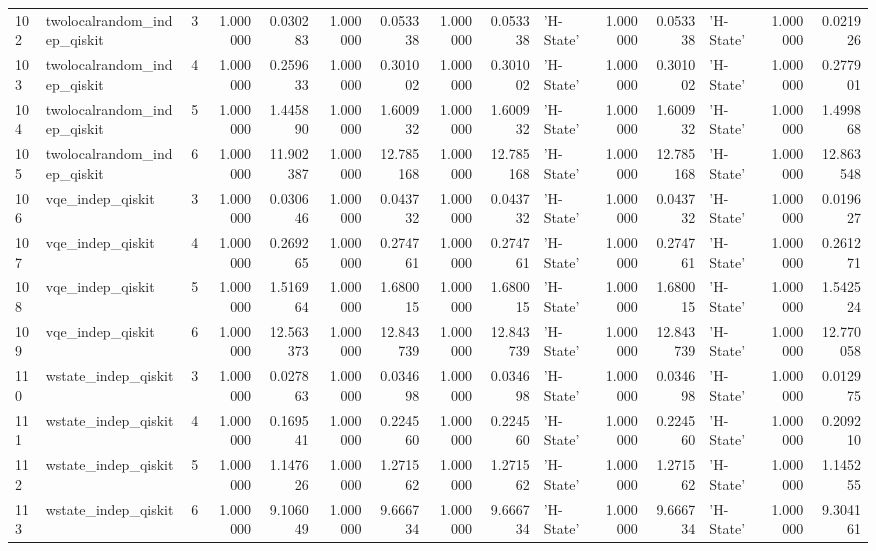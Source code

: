 \begin{table}
\begin{tabular}{llrrrrrrrlrrlrr}
102 & twolocalrandom_indep_qiskit & 3 & 1.000000 & 0.030283 & 1.000000 & 0.053338 & 1.000000 & 0.053338 & 'H-State' & 1.000000 & 0.053338 & 'H-State' & 1.000000 & 0.021926 \\
103 & twolocalrandom_indep_qiskit & 4 & 1.000000 & 0.259633 & 1.000000 & 0.301002 & 1.000000 & 0.301002 & 'H-State' & 1.000000 & 0.301002 & 'H-State' & 1.000000 & 0.277901 \\
104 & twolocalrandom_indep_qiskit & 5 & 1.000000 & 1.445890 & 1.000000 & 1.600932 & 1.000000 & 1.600932 & 'H-State' & 1.000000 & 1.600932 & 'H-State' & 1.000000 & 1.499868 \\
105 & twolocalrandom_indep_qiskit & 6 & 1.000000 & 11.902387 & 1.000000 & 12.785168 & 1.000000 & 12.785168 & 'H-State' & 1.000000 & 12.785168 & 'H-State' & 1.000000 & 12.863548 \\
106 & vqe_indep_qiskit & 3 & 1.000000 & 0.030646 & 1.000000 & 0.043732 & 1.000000 & 0.043732 & 'H-State' & 1.000000 & 0.043732 & 'H-State' & 1.000000 & 0.019627 \\
107 & vqe_indep_qiskit & 4 & 1.000000 & 0.269265 & 1.000000 & 0.274761 & 1.000000 & 0.274761 & 'H-State' & 1.000000 & 0.274761 & 'H-State' & 1.000000 & 0.261271 \\
108 & vqe_indep_qiskit & 5 & 1.000000 & 1.516964 & 1.000000 & 1.680015 & 1.000000 & 1.680015 & 'H-State' & 1.000000 & 1.680015 & 'H-State' & 1.000000 & 1.542524 \\
109 & vqe_indep_qiskit & 6 & 1.000000 & 12.563373 & 1.000000 & 12.843739 & 1.000000 & 12.843739 & 'H-State' & 1.000000 & 12.843739 & 'H-State' & 1.000000 & 12.770058 \\
110 & wstate_indep_qiskit & 3 & 1.000000 & 0.027863 & 1.000000 & 0.034698 & 1.000000 & 0.034698 & 'H-State' & 1.000000 & 0.034698 & 'H-State' & 1.000000 & 0.012975 \\
111 & wstate_indep_qiskit & 4 & 1.000000 & 0.169541 & 1.000000 & 0.224560 & 1.000000 & 0.224560 & 'H-State' & 1.000000 & 0.224560 & 'H-State' & 1.000000 & 0.209210 \\
112 & wstate_indep_qiskit & 5 & 1.000000 & 1.147626 & 1.000000 & 1.271562 & 1.000000 & 1.271562 & 'H-State' & 1.000000 & 1.271562 & 'H-State' & 1.000000 & 1.145255 \\
113 & wstate_indep_qiskit & 6 & 1.000000 & 9.106049 & 1.000000 & 9.666734 & 1.000000 & 9.666734 & 'H-State' & 1.000000 & 9.666734 & 'H-State' & 1.000000 & 9.304161 \\
\bottomrule
\end{tabular}
\end{table}
